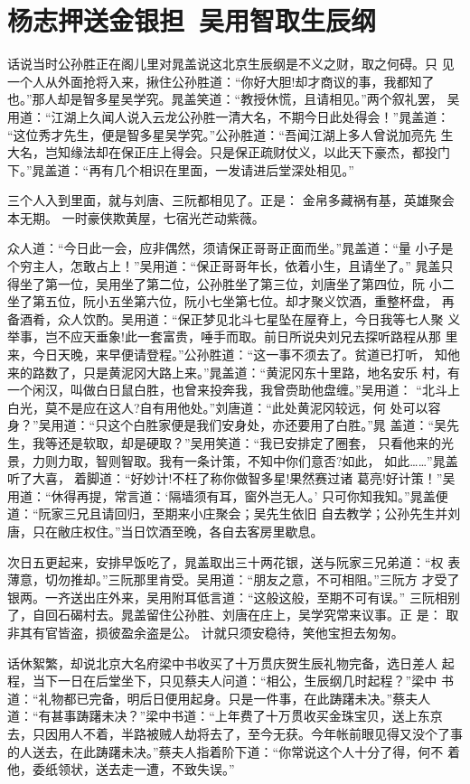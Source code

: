 \chapter{杨志押送金银担~吴用智取生辰纲}

话说当时公孙胜正在阁儿里对晁盖说这北京生辰纲是不义之财，取之何碍。只
见一个人从外面抢将入来，揪住公孙胜道：“你好大胆!却才商议的事，我都知了
也。”那人却是智多星吴学究。晁盖笑道：“教授休慌，且请相见。”两个叙礼罢，
吴用道：“江湖上久闻人说入云龙公孙胜一清大名，不期今日此处得会！”晁盖道：
“这位秀才先生，便是智多星吴学究。”公孙胜道：“吾闻江湖上多人曾说加亮先
生大名，岂知缘法却在保正庄上得会。只是保正疏财仗义，以此天下豪杰，都投门
下。”晁盖道：“再有几个相识在里面，一发请进后堂深处相见。”

三个人入到里面，就与刘唐、三阮都相见了。正是：
金帛多藏祸有基，英雄聚会本无期。
一时豪侠欺黄屋，七宿光芒动紫薇。

众人道：“今日此一会，应非偶然，须请保正哥哥正面而坐。”晁盖道：“量
小子是个穷主人，怎敢占上！”吴用道：“保正哥哥年长，依着小生，且请坐了。”
晁盖只得坐了第一位，吴用坐了第二位，公孙胜坐了第三位，刘唐坐了第四位，阮
小二坐了第五位，阮小五坐第六位，阮小七坐第七位。却才聚义饮酒，重整杯盘，
再备酒肴，众人饮酌。吴用道：“保正梦见北斗七星坠在屋脊上，今日我等七人聚
义举事，岂不应天垂象!此一套富贵，唾手而取。前日所说央刘兄去探听路程从那
里来，今日天晚，来早便请登程。”公孙胜道：“这一事不须去了。贫道已打听，
知他来的路数了，只是黄泥冈大路上来。”晁盖道：“黄泥冈东十里路，地名安乐
村，有一个闲汉，叫做白日鼠白胜，也曾来投奔我，我曾赍助他盘缠。”吴用道：
“北斗上白光，莫不是应在这人?自有用他处。”刘唐道：“此处黄泥冈较远，何
处可以容身？”吴用道：“只这个白胜家便是我们安身处，亦还要用了白胜。”晁
盖道：“吴先生，我等还是软取，却是硬取？”吴用笑道：“我已安排定了圈套，
只看他来的光景，力则力取，智则智取。我有一条计策，不知中你们意否?如此，
如此……”晁盖听了大喜，着脚道：“好妙计!不枉了称你做智多星!果然赛过诸
葛亮!好计策！”吴用道：“休得再提，常言道：‘隔墙须有耳，窗外岂无人。’
只可你知我知。”晁盖便道：“阮家三兄且请回归，至期来小庄聚会；吴先生依旧
自去教学；公孙先生并刘唐，只在敝庄权住。”当日饮酒至晚，各自去客房里歇息。

次日五更起来，安排早饭吃了，晁盖取出三十两花银，送与阮家三兄弟道：“权
表薄意，切勿推却。”三阮那里肯受。吴用道：“朋友之意，不可相阻。”三阮方
才受了银两。一齐送出庄外来，吴用附耳低言道：“这般这般，至期不可有误。”
三阮相别了，自回石碣村去。晁盖留住公孙胜、刘唐在庄上，吴学究常来议事。正
是：
取非其有官皆盗，损彼盈余盗是公。
计就只须安稳待，笑他宝担去匆匆。

话休絮繁，却说北京大名府梁中书收买了十万贯庆贺生辰礼物完备，选日差人
起程，当下一日在后堂坐下，只见蔡夫人问道：“相公，生辰纲几时起程？”梁中
书道：“礼物都已完备，明后日便用起身。只是一件事，在此踌躇未决。”蔡夫人
道：“有甚事踌躇未决？”梁中书道：“上年费了十万贯收买金珠宝贝，送上东京
去，只因用人不着，半路被贼人劫将去了，至今无获。今年帐前眼见得又没个了事
的人送去，在此踌躇未决。”蔡夫人指着阶下道：“你常说这个人十分了得，何不
着他，委纸领状，送去走一遭，不致失误。”

